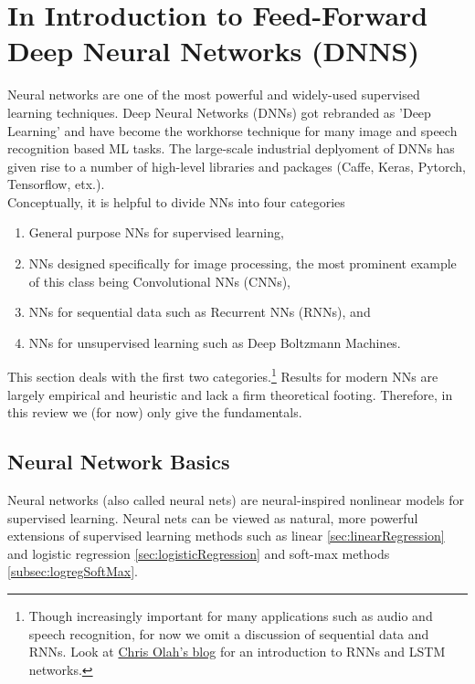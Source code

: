 \section{In Introduction to Feed-Forward Deep Neural Networks (DNNS)}
\label{sec:dnn}
 Neural networks are one of the most powerful and widely-used supervised learning techniques. Deep Neural Networks (DNNs) got rebranded as ’Deep Learning’ and have become the workhorse technique for many image and speech recognition based ML tasks. The large-scale industrial deplyoment of DNNs has given rise to a number of high-level libraries and packages (Caffe, Keras, Pytorch, Tensorflow, etx.).\\
 Conceptually, it is helpful to divide NNs into four categories 
 \begin{enumerate}
 	\item General purpose NNs for supervised learning,
 	\item NNs designed specifically for image processing, the most prominent example of this class being Convolutional NNs (CNNs), 
 	\item NNs for sequential data such as Recurrent NNs (RNNs), and
 	\item NNs for unsupervised learning such as Deep Boltzmann Machines.
 \end{enumerate}
This section deals with the first two categories.\footnote{Though increasingly important for many applications such as audio and speech recognition, for now we omit a discussion of sequential data and RNNs. Look at \href{https://colah.github.io/posts/2015-08-Understanding-LSTMs/}{Chris Olah's blog} for an introduction to RNNs and LSTM networks.}
Results for modern NNs are largely empirical and heuristic and lack a firm theoretical footing. Therefore, in this review we (for now) only give the fundamentals.

\subsection{Neural Network Basics}
Neural networks (also called neural nets) are neural-inspired nonlinear models for supervised learning. Neural nets can be viewed as natural, more powerful extensions of supervised learning methods such as linear \ref{sec:linearRegression} and logistic regression \ref{sec:logisticRegression} and soft-max methods \ref{subsec:logregSoftMax}.
